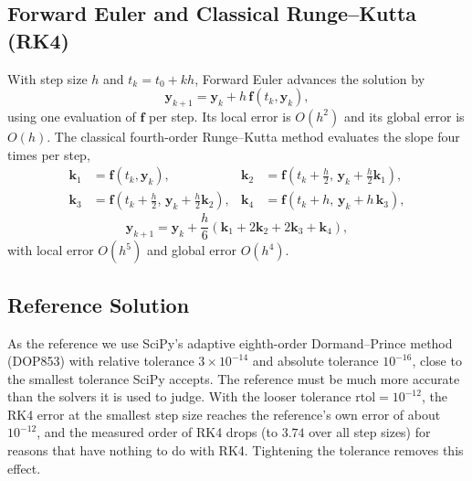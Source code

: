 \documentclass[11pt,a4paper]{article}
\begin{document}
\subsection{Forward Euler and Classical Runge--Kutta (RK4)}
With step size $h$ and $t_k = t_0 + kh$, Forward Euler advances the solution by
\begin{equation}
    \mathbf{y}_{k+1} = \mathbf{y}_k + h\, \mathbf{f}(t_k, \mathbf{y}_k),
\end{equation}
using one evaluation of $\mathbf{f}$ per step. Its local error is $O(h^2)$ and its global error is $O(h)$. The classical fourth-order Runge--Kutta method evaluates the slope four times per step,
\begin{align}
    \mathbf{k}_1 &= \mathbf{f}(t_k, \mathbf{y}_k), &
    \mathbf{k}_2 &= \mathbf{f}\!\left(t_k + \tfrac{h}{2},\, \mathbf{y}_k + \tfrac{h}{2}\mathbf{k}_1\right), \nonumber\\
    \mathbf{k}_3 &= \mathbf{f}\!\left(t_k + \tfrac{h}{2},\, \mathbf{y}_k + \tfrac{h}{2}\mathbf{k}_2\right), &
    \mathbf{k}_4 &= \mathbf{f}(t_k + h,\, \mathbf{y}_k + h\,\mathbf{k}_3),
\end{align}
\begin{equation}
    \mathbf{y}_{k+1} = \mathbf{y}_k + \frac{h}{6}\left(\mathbf{k}_1 + 2\mathbf{k}_2 + 2\mathbf{k}_3 + \mathbf{k}_4\right),
\end{equation}
with local error $O(h^5)$ and global error $O(h^4)$.

\subsection{Reference Solution}
As the reference we use SciPy's adaptive eighth-order Dormand--Prince method (DOP853) with relative tolerance $3 \times 10^{-14}$ and absolute tolerance $10^{-16}$, close to the smallest tolerance SciPy accepts. The reference must be much more accurate than the solvers it is used to judge. With the looser tolerance $\text{rtol} = 10^{-12}$, the RK4 error at the smallest step size reaches the reference's own error of about $10^{-12}$, and the measured order of RK4 drops (to $3.74$ over all step sizes) for reasons that have nothing to do with RK4. Tightening the tolerance removes this effect.
\end{document}
